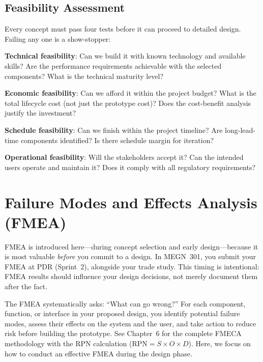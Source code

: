 \documentclass[11pt,letterpaper,twoside,openany]{book}
\begin{document}
\subsection{Feasibility Assessment}
Every concept must pass four tests before it can proceed to detailed design. Failing any one is a show-stopper:

\textbf{Technical feasibility}: Can we build it with known technology and available skills? Are the performance requirements achievable with the selected components? What is the technical maturity level?

\textbf{Economic feasibility}: Can we afford it within the project budget? What is the total lifecycle cost (not just the prototype cost)? Does the cost-benefit analysis justify the investment?

\textbf{Schedule feasibility}: Can we finish within the project timeline? Are long-lead-time components identified? Is there schedule margin for iteration?

\textbf{Operational feasibility}: Will the stakeholders accept it? Can the intended users operate and maintain it? Does it comply with all regulatory requirements?

\FloatBarrier
\section{Failure Modes and Effects Analysis (FMEA)}
FMEA is introduced here---during concept selection and early design---because it is most valuable \emph{before} you commit to a design. In MEGN~301, you submit your FMEA at PDR (Sprint~2), alongside your trade study. This timing is intentional: FMEA results should influence your design decisions, not merely document them after the fact.

The FMEA systematically asks: ``What can go wrong?'' For each component, function, or interface in your proposed design, you identify potential failure modes, assess their effects on the system and the user, and take action to reduce risk before building the prototype. See Chapter~6 for the complete FMECA methodology with the RPN calculation ($\text{RPN} = S \times O \times D$). Here, we focus on how to conduct an effective FMEA during the design phase.
\end{document}
